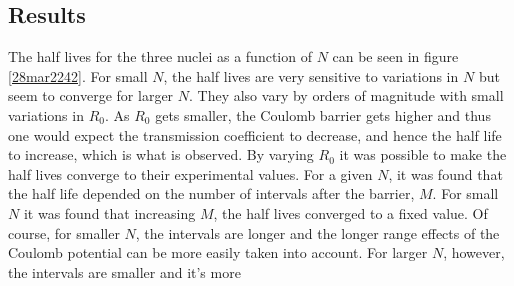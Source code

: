 \documentclass[twocolumn]{article}
\begin{document}
\begin{large}
\subsection*{Results}
The half lives for the three nuclei as a function of $N$ can be seen in figure \ref{28mar2242}. For small $N$, the half lives are very sensitive to variations in $N$ but seem to converge for larger $N$. They also vary by orders of magnitude with small variations in $R_0$. As $R_0$ gets smaller, the Coulomb barrier gets higher and thus one would expect the transmission coefficient to decrease, and hence the half life to increase, which is what is observed. By varying $R_0$ it was possible to make the half lives converge to their experimental values. For a given $N$, it was found that the half life depended on the number of intervals after the barrier, $M$. For small $N$ it was found that increasing $M$, the half lives converged to a fixed value. Of course, for smaller $N$, the intervals are longer and the longer range effects of the Coulomb potential can be more easily taken into account. For larger $N$, however, the intervals are smaller and it's more 


\end{large}
\end{document}
